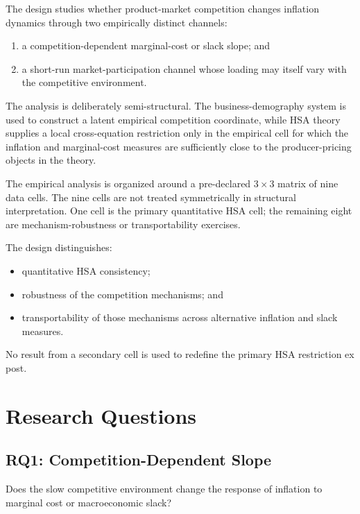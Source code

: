 \documentclass[11pt]{article}
\begin{document}
The design studies whether product-market competition changes inflation dynamics through two empirically distinct channels:
\begin{enumerate}
\item a competition-dependent marginal-cost or slack slope; and
\item a short-run market-participation channel whose loading may itself vary with the competitive environment.
\end{enumerate}

The analysis is deliberately semi-structural. The business-demography system is used to construct a latent empirical competition coordinate, while HSA theory supplies a local cross-equation restriction only in the empirical cell for which the inflation and marginal-cost measures are sufficiently close to the producer-pricing objects in the theory.

The empirical analysis is organized around a pre-declared \(3\times3\) matrix of nine data cells. The nine cells are not treated symmetrically in structural interpretation. One cell is the primary quantitative HSA cell; the remaining eight are mechanism-robustness or transportability exercises.

The design distinguishes:
\begin{itemize}
\item quantitative HSA consistency;
\item robustness of the competition mechanisms; and
\item transportability of those mechanisms across alternative inflation and slack measures.
\end{itemize}

No result from a secondary cell is used to redefine the primary HSA restriction ex post.

\section{Research Questions}

\subsection{RQ1: Competition-Dependent Slope}

Does the slow competitive environment change the response of inflation to marginal cost or macroeconomic slack?
\end{document}
